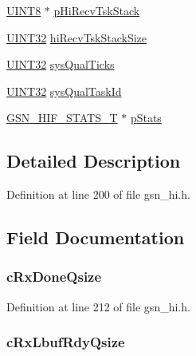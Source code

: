 \begin{DoxyCompactItemize}
\item 
\hyperlink{a00660_gab27e9918b538ce9d8ca692479b375b6a}{UINT8} $\ast$ \hyperlink{a00088_a595cb18d64b13ca15a7326e0c70e7b46}{pHiRecvTskStack}
\item 
\hyperlink{a00660_gae1e6edbbc26d6fbc71a90190d0266018}{UINT32} \hyperlink{a00088_a40540894d5ba0680b0727f984f617bc7}{hiRecvTskStackSize}
\item 
\hyperlink{a00660_gae1e6edbbc26d6fbc71a90190d0266018}{UINT32} \hyperlink{a00088_a3b8eb219c70a5f7fc6dcb9d9643cbc31}{sysQualTicks}
\item 
\hyperlink{a00660_gae1e6edbbc26d6fbc71a90190d0266018}{UINT32} \hyperlink{a00088_a3d8d24efe6d7728a0e60320295f3f6c2}{sysQualTaskId}
\item 
\hyperlink{a00092}{GSN\_\-HIF\_\-STATS\_\-T} $\ast$ \hyperlink{a00088_ad4d017d4879246dcdc740c6738efede0}{pStats}
\end{DoxyCompactItemize}


\subsection{Detailed Description}


Definition at line 200 of file gsn\_\-hi.h.



\subsection{Field Documentation}
\hypertarget{a00088_a01336dac1014d0204e8e99074773f719}{
\subsubsection[{cRxDoneQsize}]{ {\bf cRxDoneQsize}}}
\label{a00088_a01336dac1014d0204e8e99074773f719}


Definition at line 212 of file gsn\_\-hi.h.

\hypertarget{a00088_ac21b2c07570973b9baff2b492d13853a}{
\subsubsection[{cRxLbufRdyQsize}]{ {\bf cRxLbufRdyQsize}}}
\label{a00088_ac21b2c07570973b9baff2b492d13853a}


